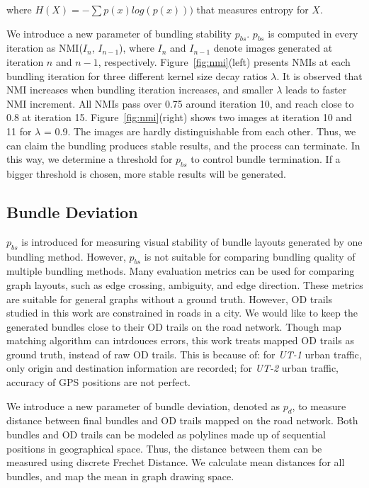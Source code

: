 \noindent
where $H(X) = -\sum p(x)log(p(x)))$ that measures entropy for $X$.

We introduce a new parameter of bundling stability $p_{bs}$.
$p_{bs}$ is computed in every iteration as NMI($I_n$, $I_{n-1}$), where $I_n$ and $I_{n-1}$ denote images generated at iteration $n$ and $n-1$, respectively.
Figure~\ref{fig:nmi}(left) presents NMIs at each bundling iteration for three different kernel size decay ratios $\lambda$.
It is observed that NMI increases when bundling iteration increases, and smaller $\lambda$ leads to faster NMI increment.
All NMIs pass over 0.75 around iteration 10, and reach close to 0.8 at iteration 15.
Figure~\ref{fig:nmi}(right) shows two images at iteration 10 and 11 for $\lambda$ = 0.9.
The images are hardly distinguishable from each other.
Thus, we can claim the bundling produces stable results, and the process can terminate.
In this way, we determine a threshold for $p_{bs}$ to control bundle termination.
If a bigger threshold is chosen, more stable results will be generated.

\subsection{Bundle Deviation}
$p_{bs}$ is introduced for measuring visual stability of bundle layouts generated by one bundling method.
However, $p_{bs}$ is not suitable for comparing bundling quality of multiple bundling methods.
Many evaluation metrics can be used for comparing graph layouts, such as edge crossing, ambiguity, and edge direction.
These metrics are suitable for general graphs without a ground truth.
However, OD trails studied in this work are constrained in roads in a city.
We would like to keep the generated bundles close to their OD trails on the road network.
Though map matching algorithm can intrdouces errors, this work treats mapped OD trails as ground truth, instead of raw OD trails.
This is because of: for \textit{UT-1} urban traffic, only origin and destination information are recorded; for \textit{UT-2} urban traffic, accuracy of GPS positions are not perfect.

We introduce a new parameter of bundle deviation, denoted as $p_{d}$, to measure distance between final bundles and OD trails mapped on the road network.
Both bundles and OD trails can be modeled as polylines made up of sequential positions in geographical space.
Thus, the distance between them can be measured using discrete Frechet Distance.
We calculate mean distances for all bundles, and map the mean in graph drawing space.